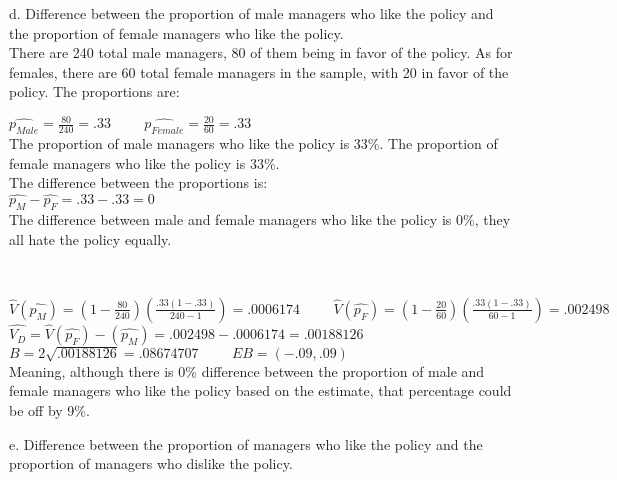 \documentclass{article}
\begin{document}
\medskip
d. Difference between the proportion of male managers who like the policy and the proportion of female managers who like the policy. \\
There are 240 total male managers, 80 of them being in favor of the policy. As for females, there are 60 total female managers in the sample, with 20 in favor of the policy. The proportions are: \\
\begin{center}
    $\hat{p_{Male}} = \frac{80}{240} = .33 \hspace{1cm} \hat{p_{Female}} = \frac{20}{60} = .33 $\\
    The proportion of male managers who like the policy is 33\%. The proportion of female managers who like the policy is 33\%. \\
    The difference between the proportions is: \\
    \smallskip
    $\hat{p_M} - \hat{p_F} = .33 - .33 = 0$ \\
    The difference between male and female managers who like the policy is 0\%, they all hate the policy equally. 
\end{center}
 \\
\begin{center}
    $\hat{V}(\hat{p_M}) = (1-\frac{80}{240})(\frac{.33(1-.33)}{240-1}) = .0006174 \hspace{1cm} \hat{V}(\hat{p_F}) = (1-\frac{20}{60})(\frac{.33(1-.33)}{60-1}) = .002498 $ \\
    \smallskip
    $\hat{V_D} = \hat{V}(\hat{p_F}) - (\hat{p_M}) = .002498 - .0006174 = .00188126 $ \\
    \smallskip
    $B = 2\sqrt{.00188126} = .08674707 \hspace{1cm} EB = (-.09, .09) $ \\ 
    \smallskip
    Meaning, although there is 0\% difference between the proportion of male and female managers who like the policy based on the estimate, that percentage could be off by 9\%. 
\end{center}
\medskip
e. Difference between the proportion of managers who like the policy and the proportion of managers who dislike the policy. \\
 \\
\end{document}
